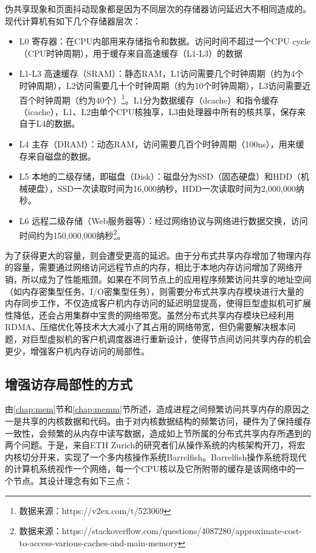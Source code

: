 \label{chap:STOR}
伪共享现象和页面抖动现象都是因为不同层次的存储器访问延迟大不相同造成的。现代计算机有如下几个存储器层次\cite{csapp}：
\begin{itemize}
  \item L0 寄存器：在CPU内部用来存储指令和数据。访问时间不超过一个CPU cycle（CPU时钟周期），用于缓存来自高速缓存（L1-L3）的数据
  \item L1-L3 高速缓存（SRAM）：静态RAM，L1访问需要几个时钟周期（约为4个时钟周期），L2访问需要几十个时钟周期（约为10个时钟周期），L3访问需要近百个时钟周期（约为40个）\footnote{数据来源：https://v2ex.com/t/523069}。L1分为数据缓存（dcache）和指令缓存（icache），L1、L2由单个CPU核独享，L3由处理器中所有的核共享，保存来自于L4的数据。
  \item L4 主存（DRAM）：动态RAM，访问需要几百个时钟周期（100ns），用来缓存来自磁盘的数据。
  \item L5 本地的二级存储，即磁盘（Disk）：磁盘分为SSD（固态硬盘）和HDD（机械硬盘），SSD一次读取时间为16,000纳秒，HDD一次读取时间为2,000,000纳秒。
  \item L6 远程二级存储（Web服务器等）：经过网络协议与网络进行数据交换，访问时间约为150,000,000纳秒\footnote{数据来源：https://stackoverflow.com/questions/4087280/approximate-cost-to-access-various-caches-and-main-memory}。
\end{itemize}

为了获得更大的容量，则会遭受更高的延迟。由于分布式共享内存增加了物理内存的容量，需要通过网络访问远程节点的内存，相比于本地内存访问增加了网络开销，所以成为了性能瓶颈。如果在不同节点上的应用程序频繁访问共享的地址空间（如内存密集型任务、I/O密集型任务），则需要分布式共享内存模块进行大量的内存同步工作，不仅造成客户机内存访问的延迟明显提高，使得巨型虚拟机可扩展性降低，还会占用集群中宝贵的网络带宽。虽然分布式共享内存模块已经利用RDMA、压缩优化等技术大大减小了其占用的网络带宽，但仍需要解决根本问题，对巨型虚拟机的客户机调度器进行重新设计，使得节点间访问共享内存的机会更少，增强客户机内存访问的局部性。
\subsection{增强访存局部性的方式}
由\ref{chap:mem}节和\ref{chap:memm}节所述，造成进程之间频繁访问共享内存的原因之一是共享的内核数据和代码。由于对内核数据结构的频繁访问，硬件为了保持缓存一致性，会频繁的从内存中读写数据，造成如上节所属的分布式共享内存所遇到的两个问题。于是，来自ETH Zurich的研究者们从操作系统的内核架构开刀，将宏内核切分开来，实现了一个多内核操作系统Barrelfish\cite{barrelfish}。Barrelfish操作系统将现代的计算机系统视作一个网络，每一个CPU核以及它所附带的缓存是该网络中的一个节点。其设计理念有如下三点：

